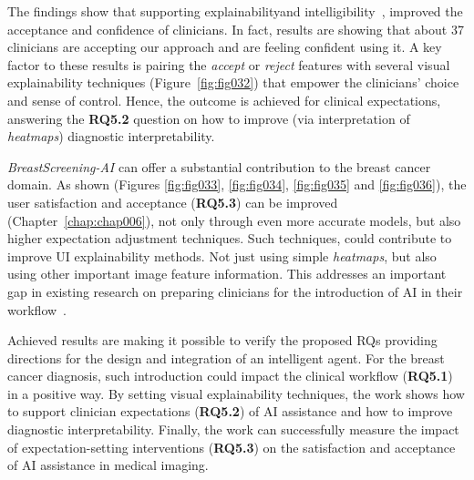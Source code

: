 The findings show that supporting explainability\footnotemark[34] and intelligibility\footnotemark[35]~\cite{Abdul:2018:TTE:3173574.3174156}, improved the acceptance and confidence of clinicians.
In fact, results are showing that about 37 clinicians are accepting our approach and are feeling confident using it.
A key factor to these results is pairing the {\it accept} or {\it reject} features with several visual explainability techniques (Figure~\ref{fig:fig032}) that empower the clinicians' choice and sense of control.
Hence, the outcome is achieved for clinical expectations, answering the {\bf RQ5.2} question on how to improve (via interpretation of {\it heatmaps}) diagnostic interpretability.



{\it BreastScreening-AI} can offer a substantial contribution to the breast cancer domain.
As shown (Figures \ref{fig:fig033}, \ref{fig:fig034}, \ref{fig:fig035} and \ref{fig:fig036}), the user satisfaction and acceptance ({\bf RQ5.3}) can be improved (Chapter~\ref{chap:chap006}), not only through even more accurate models, but also higher expectation adjustment techniques.
Such techniques, could contribute to improve \ac{UI} explainability methods.
Not just using simple {\it heatmaps}, but also using other important image feature information.
This addresses an important gap in existing research on preparing clinicians for the introduction of \ac{AI} in their workflow~\cite{Alkhatib:2019:SAT:3290605.3300760, challen2019artificial, shah2019artificial, szolovits2019artificial}.

Achieved results are making it possible to verify the proposed RQs providing directions for the design and integration of an intelligent agent.
For the breast cancer diagnosis, such introduction could impact the clinical workflow ({\bf RQ5.1}) in a positive way.
By setting visual explainability techniques, the work shows how to support clinician expectations ({\bf RQ5.2}) of \ac{AI} assistance and how to improve diagnostic interpretability.
Finally, the work can successfully measure the impact of expectation-setting interventions ({\bf RQ5.3}) on the satisfaction and acceptance of \ac{AI} assistance in medical imaging.

